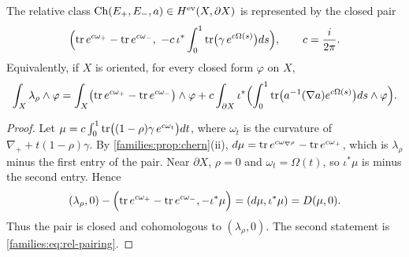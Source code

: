\begin{theorem}\label{families:thm:fedosov}
  The relative class $\operatorname{Ch}(E_+,E_-,a)\in H^{\mathrm{ev}}(X,\partial X)$ is represented by
  the closed pair
  \begin{equation*}
    \Bigl(\operatorname{tr} e^{c\omega_+}-\operatorname{tr} e^{c\omega_-},\ -c\,\iota^*\int_0^1\operatorname{tr}\bigl(
    \gamma\,e^{c\Omega(s)}\bigr)ds\Bigr),\qquad c=\frac{i}{2\pi}.
  \end{equation*}
  Equivalently, if $X$ is oriented, for every closed form $\varphi$ on $X$,
  \begin{equation*}
    \int_X\lambda_\rho\wedge\varphi=\int_X\bigl(\operatorname{tr} e^{c\omega_+}-\operatorname{tr}
    e^{c\omega_-}\bigr)\wedge\varphi+c\int_{\partial X}\iota^*\Bigl(\int_0^1
    \operatorname{tr}\bigl(a^{-1}(\nabla a)e^{c\Omega(s)}\bigr)ds\wedge\varphi\Bigr).
  \end{equation*}
\end{theorem}
\begin{proof}
  Let $\mu=c\int_0^1\operatorname{tr}\bigl((1-\rho)\gamma\,e^{c\omega_t}\bigr)dt$, where
  $\omega_t$ is the curvature of $\nabla_++t(1-\rho)\gamma$. By
  \cref{families:prop:chern}(ii), $d\mu=\operatorname{tr} e^{c\omega_{\nabla^\rho}}-\operatorname{tr}
  e^{c\omega_+}$, which is $\lambda_\rho$ minus the first entry of the pair.
  Near $\partial X$, $\rho=0$ and $\omega_t=\Omega(t)$, so $\iota^*\mu$ is
  minus the second entry. Hence
  \begin{equation*}
    (\lambda_\rho,0)-\Bigl(\operatorname{tr} e^{c\omega_+}-\operatorname{tr} e^{c\omega_-},-\iota^*\mu
    \Bigr)=(d\mu,\iota^*\mu)=D(\mu,0).
  \end{equation*}
  Thus the pair is closed and cohomologous to $(\lambda_\rho,0)$. The second
  statement is \eqref{families:eq:rel-pairing}.
\end{proof}

